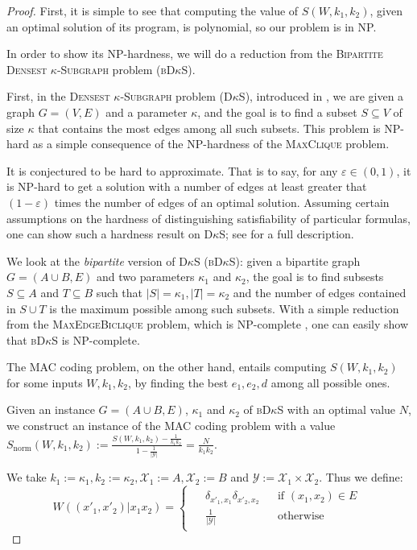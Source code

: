 \begin{proof}
First, it is simple to see that computing the value of $S(W,k_1,k_2)$, given an optimal solution of its program, is polynomial, so our problem is in \textrm{NP}.

In order to show its \textrm{NP}-hardness, we will do a reduction from the \textsc{Bipartite Densest $\kappa$-Subgraph} problem (\textsc{bD$\kappa$S}).

First, in the \textsc{Densest $\kappa$-Subgraph} problem (\textsc{D$\kappa$S}), introduced in \cite{FKP01}, we are given a graph $G=(V,E)$ and a parameter $\kappa$, and the goal is to find a subset $S \subseteq V$ of size $\kappa$ that contains the most edges among all such subsets. This problem is {\rm NP}-hard as a simple consequence of the {\rm NP}-hardness of the \textsc{MaxClique} problem.

It is conjectured to be hard to approximate. That is to say, for any $\varepsilon \in (0,1)$, it is {\rm NP}-hard to get a solution with a number of edges at least greater that $\left(1-\varepsilon\right)$ times the number of edges of an optimal solution. Assuming certain assumptions on the hardness of distinguishing satisfiability of particular formulas, one can show such a hardness result on \textsc{D$\kappa$S}; see \cite{AAMMW11} for a full description.

We look at the \emph{bipartite} version of \textsc{D$\kappa$S} (\textsc{bD$\kappa$S}): given a bipartite graph $G = (A \cup B, E)$ and two parameters $\kappa_1$ and $\kappa_2$, the goal is to find subsests $S \subseteq A$ and $T \subseteq B$ such that $|S|=\kappa_1,|T|=\kappa_2$ and the number of edges contained in $S \cup T$ is the maximum possible among such subsets. With a simple reduction from the \textsc{MaxEdgeBiclique} problem, which is {\rm NP}-complete \cite{Peeters03}, one can easily show that \textsc{bD$\kappa$S} is {\rm NP}-complete.

The MAC coding problem, on the other hand, entails computing $S(W,k_1,k_2)$ for some inputs $W,k_1,k_2$, by finding the best $e_1,e_2,d$ among all possible ones.

Given an instance $G = (A \cup B, E)$, $\kappa_1$ and $\kappa_2$ of \textsc{bD$\kappa$S} with an optimal value $N$, we construct an instance of the MAC coding problem with a value $S_{\text{norm}}(W,k_1,k_2) := \frac{S(W,k_1,k_2)-\frac{1}{k_1k_2}}{1-\frac{1}{|\mathcal{Y}|}} = \frac{N}{k_1k_2}$.

We take $k_1:=\kappa_1,k_2:=\kappa_2,\mathcal{X}_1:=A,\mathcal{X}_2:=B$ and $\mathcal{Y}:=\mathcal{X}_1 \times \mathcal{X}_2$. Thus we define:
\begin{equation}
  W((x'_1,x'_2)|x_1x_2) = \begin{cases}
      \begin{aligned}
      &\delta_{x'_1,x_1}\delta_{x'_2,x_2} &&\text{if } (x_1,x_2) \in E\\
      &\frac{1}{|\mathcal{Y}|} &&\text{otherwise}
      \end{aligned}
\end{cases}
\end{equation}


\end{proof}

